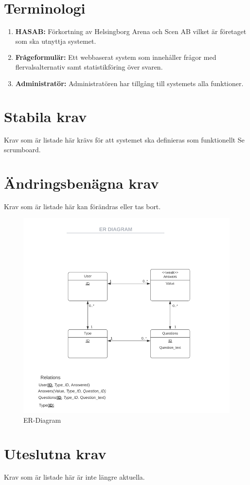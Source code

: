 \documentclass{article}
\begin{document}
    \section{Terminologi}
    \begin{enumerate}
        \item \textbf{HASAB:} Förkortning av Helsingborg Arena och Scen AB vilket är företaget som ska utnyttja systemet.
        \item \textbf{Frågeformulär:} Ett webbaserat system som innehåller frågor med flervalsalternativ samt statistikföring över svaren.
        \item \textbf{Administratör:} Administratören har tillgång till systemets alla funktioner.
    \end{enumerate}
    
    \section{Stabila krav}
    Krav som är listade här krävs för att systemet ska definieras som funktionellt
    Se scrumboard.
    
    \section{Ändringsbenägna krav}
    Krav som är listade här kan förändras eller tas bort.
    
    \begin{figure}[h!]
    
    \includegraphics[width=150mm]{ERDIAGRAM.png}
    \caption{ER-Diagram}
    \end{figure}
    
    \section{Uteslutna krav}
    Krav som är listade här är inte längre aktuella.
    
    

    
        





\end{document}

